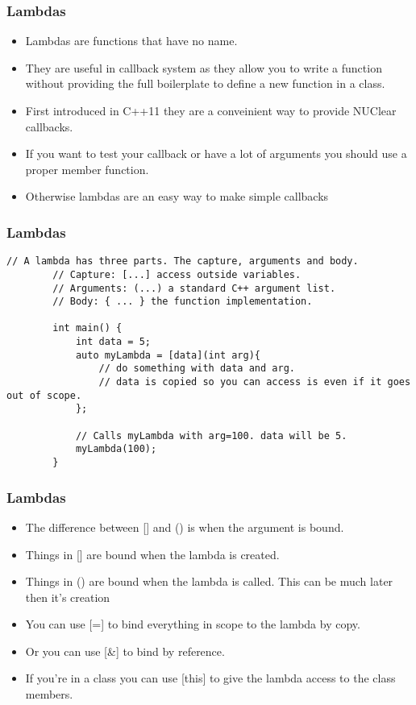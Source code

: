 \documentclass{beamer}
\begin{document}
\begin{frame}
	\frametitle{Lambdas}
	\begin{itemize}
		\item Lambdas are functions that have no name. 
		\item They are useful in callback system as they allow you to write a function without providing the full boilerplate
			to define a new function in a class.
		\item First introduced in C++11 they are a conveinient way to provide NUClear callbacks.
		\item If you want to test your callback or have a lot of arguments you should use a proper member function.
		\item Otherwise lambdas are an easy way to make simple callbacks
	\end{itemize}
\end{frame}

\begin{frame}[fragile]
	\frametitle{Lambdas}
	\begin{lstlisting}[language=nuclear]
		// A lambda has three parts. The capture, arguments and body.
		// Capture: [...] access outside variables.
		// Arguments: (...) a standard C++ argument list.
		// Body: { ... } the function implementation.

		int main() {
		    int data = 5;
		    auto myLambda = [data](int arg){ 
		        // do something with data and arg.
		        // data is copied so you can access is even if it goes out of scope.
		    };
		    
		    // Calls myLambda with arg=100. data will be 5.
		    myLambda(100);
		}
	\end{lstlisting}
\end{frame}

\begin{frame}
	\frametitle{Lambdas}
	\begin{itemize}
		\item The difference between [] and () is when the argument is bound.
		\item Things in [] are bound when the lambda is created.
		\item Things in () are bound when the lambda is called. This can be much later then it's creation
		\item You can use [=] to bind everything in scope to the lambda by copy.
		\item Or you can use [\&] to bind by reference.
		\item If you're in a class you can use [this] to give the lambda access to the class members.
	\end{itemize}
\end{frame}
\end{document}
